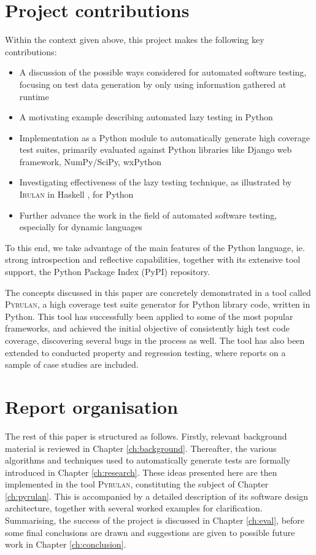 \documentclass{icldt}
\numberwithin{equation}{section}       %
\begin{document}
\section{Project contributions}
Within the context given above, this project makes the following key contributions:

\begin{itemize}
	\item A discussion of the possible ways considered for automated software testing, focusing on test data generation by only using information gathered at runtime
	\item A motivating example describing automated lazy testing in Python
	\item Implementation as a Python module to automatically generate high coverage test suites, primarily evaluated against Python libraries like Django web framework, NumPy/SciPy, wxPython
	\item Investigating effectiveness of the lazy testing technique, as illustrated by \textsc{Irulan} in Haskell \cite{Allwood2011}, for Python
	\item Further advance the work in the field of automated software testing, especially for dynamic languages
\end{itemize}

To this end, we take advantage of the main features of the Python language, ie. strong introspection and reflective capabilities, together with its extensive tool support, the Python Package Index (PyPI) repository.

The concepts discussed in this paper are concretely demonstrated in a tool called \textsc{Pyrulan}, a high coverage test suite generator for Python library code, written in Python. This tool has successfully been applied to some of the most popular frameworks, and achieved the initial objective of consistently high test code coverage, discovering several bugs in the process as well. The tool has also been extended to conducted property and regression testing, where reports on a sample of case studies are included.

\section{Report organisation}
The rest of this paper is structured as follows. Firstly, relevant background material is reviewed in Chapter \ref{ch:background}. Thereafter, the various algorithms and techniques used to automatically generate tests are formally introduced in Chapter \ref{ch:research}. These ideas presented here are then implemented in the tool \textsc{Pyrulan}, constituting the subject of Chapter \ref{ch:pyrulan}. This is accompanied by a detailed description of its software design architecture, together with several worked examples for clarification. Summarising, the success of the project is discussed in Chapter \ref{ch:eval}, before some final conclusions are drawn and suggestions are given to possible future work in Chapter \ref{ch:conclusion}.
\end{document}
